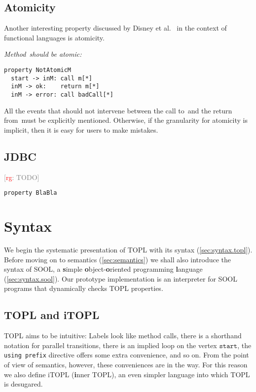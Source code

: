 \documentclass[preprint]{sigplanconf} %
\newcommand{\note}[2]{\textcolor{gray}{[\textcolor{red}{#1}: #2]}}
\newcommand{\rg}[1]{\note{rg}{#1}}
\newcommand{\delimitVerbatim}{\par\nobreak\smallskip\noindent}
\newcommand{\start}{\ensuremath{\mathtt{start}}\xspace}
\theoremstyle{definition}
\theoremstyle{remark}
\begin{document}
\subsection{Atomicity} %

Another interesting property discussed by Disney et al.~\cite{disney2011} in the context of functional languages is atomicity.

\medskip\emph{Method~\Verb@m@ should be atomic:}
\delimitVerbatim
\begin{Verbatim}
property NotAtomicM
  start -> inM: call m[*]
  inM -> ok:    return m[*]
  inM -> error: call badCall[*]
\end{Verbatim}
\delimitVerbatim
All the events that should not intervene between the call to~\Verb@m@ and the return from~\Verb@m@ must be explicitly mentioned.
Otherwise, if the granularity for atomicity is implicit, then it is easy for users to make mistakes.

\subsection{JDBC} \label{sec:examples.jdbc} %

\rg{TODO}
\par\medskip\noindent
\begin{Verbatim}
property BlaBla
\end{Verbatim}

\section{Syntax}\label{sec:syntax} %

We begin the systematic presentation of TOPL with its syntax (\autoref{sec:syntax.topl}).
Before moving on to semantics (\autoref{sec:semantics}) we shall also introduce the syntax of SOOL, a \textbf simple \textbf object-\textbf oriented programming \textbf language (\autoref{sec:syntax.sool}).
Our prototype implementation is an interpreter for SOOL programs that dynamically checks TOPL properties.

\subsection{TOPL and iTOPL}\label{sec:syntax.topl} %


TOPL aims to be intuitive:
Labels look like method calls, there is a shorthand notation for parallel transitions, there is an implied loop on the vertex \start, the \texttt{using prefix} directive offers some extra convenience, and so on.
From the point of view of semantics, however, these conveniences are in the way.
For this reason we also define iTOPL (\textbf inner TOPL), an even simpler language into which TOPL is desugared.
\end{document}
